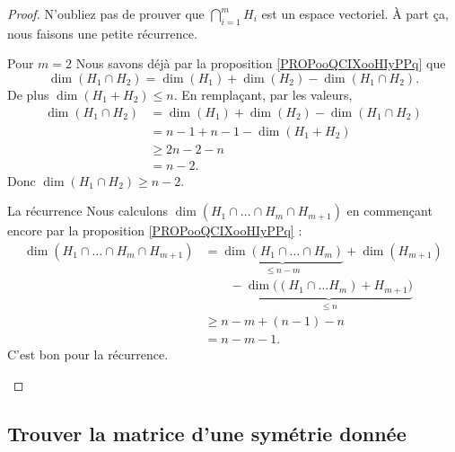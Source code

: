 \begin{proof}
    N'oubliez pas de prouver que \( \bigcap_{i=1}^mH_i\) est un espace vectoriel. À part ça, nous faisons une petite récurrence.
    \begin{subproof}
        \item[Pour \( m=2\)]
            Nous savons déjà par la proposition \ref{PROPooQCIXooHIyPPq} que
            \begin{equation}
                \dim(H_1\cap H_2)=\dim(H_1)+\dim(H_2)-\dim(H_1\cap H_2).
            \end{equation}
            De plus \( \dim(H_1+H_2)\leq n\). En remplaçant, par les valeurs,
            \begin{subequations}
                \begin{align}
                    \dim(H_1\cap H_2)&=\dim(H_1)+\dim(H_2)-\dim(H_1\cap H_2)\\
                    &=n-1+n-1-\dim(H_1+H_2)\\
                    &\geq 2n-2-n\\
                    &=n-2.
                \end{align}
            \end{subequations}
            Donc \( \dim(H_1\cap H_2)\geq n-2\).

        \item[La récurrence]
            Nous calculons \( \dim(H_1\cap\ldots\cap H_m\cap H_{m+1})\) en commençant encore par la proposition \ref{PROPooQCIXooHIyPPq} :
            \begin{subequations}
                \begin{align}
                    \dim(H_1\cap \ldots\cap H_m\cap H_{m+1})&=\underbrace{\dim(H_1\cap\ldots\cap H_m)}_{\leq n-m}+\dim(H_{m+1})\\
                        &\qquad -\underbrace{\dim\big( (H_1\cap\ldots H_m)+H_{m+1} \big)}_{\leq n}\\
                    &\geq n-m+(n-1)-n\\
                    &=n-m-1.
                \end{align}
            \end{subequations}
            C'est bon pour la récurrence.
    \end{subproof}
\end{proof}

\subsection{Trouver la matrice d'une symétrie donnée}
\label{SubSecMtrSym}


